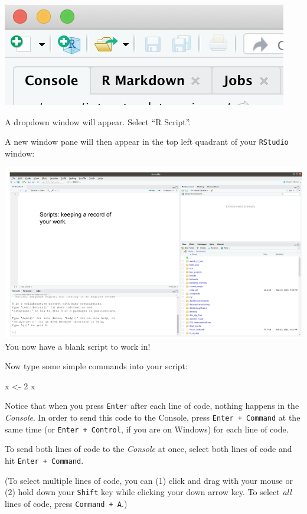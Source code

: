 \documentclass[
]{book}
\newenvironment{Shaded}{\begin{snugshade}}{\end{snugshade}}
\newcommand{\DecValTok}[1]{\textcolor[rgb]{0.00,0.00,0.81}{#1}}
\newcommand{\NormalTok}[1]{#1}
\newcommand{\StringTok}[1]{\textcolor[rgb]{0.31,0.60,0.02}{#1}}
\begin{document}
\includegraphics{img/rstudio_newscript.png}

A dropdown window will appear. Select ``R Script''.

A new window pane will then appear in the top left quadrant of your \texttt{RStudio} window:

\includegraphics{img/rstudio_scripts.png}
You now have a blank script to work in!

Now type some simple commands into your script:

\begin{Shaded}
\begin{Highlighting}[]
\NormalTok{x <-}\StringTok{ }\DecValTok{2} 
\NormalTok{x}
\end{Highlighting}
\end{Shaded}

Notice that when you press \texttt{Enter} after each line of code, nothing happens in the \emph{Console}. In order to send this code to the Console, press \texttt{Enter\ +\ Command} at the same time (or \texttt{Enter\ +\ Control}, if you are on Windows) for each line of code.

To send both lines of code to the \emph{Console} at once, select both lines of code and hit \texttt{Enter\ +\ Command}.

(To select multiple lines of code, you can (1) click and drag with your mouse or (2) hold down your \texttt{Shift} key while clicking your down arrow key. To select \emph{all} lines of code, press \texttt{Command\ +\ A}.)
\end{document}
